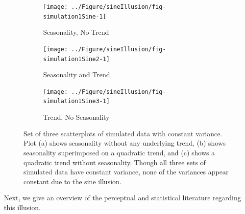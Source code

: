 \documentclass[11pt]{isuthesis}\usepackage[]{graphicx}\usepackage[]{color}
\newenvironment{knitrout}{}{} %
\begin{document}
\begin{figure}[h!tbp]\centering
\begin{subfigure}[b]{.31\textwidth}
  \centering
\begin{knitrout}
\color{fgcolor}

{\centering \texttt{[image: ../Figure/sineIllusion/fig-simulation1Sine-1]} 

}



\end{knitrout}
  \caption{\small Seasonality, No Trend}
  \label{simulation1}
\end{subfigure}
\begin{subfigure}[b]{.31\textwidth}\centering
\begin{knitrout}
\color{fgcolor}

{\centering \texttt{[image: ../Figure/sineIllusion/fig-simulation1Sine2-1]} 

}



\end{knitrout}
  \caption{\small Seasonality and Trend}
  \label{simulation2}
\end{subfigure}
\begin{subfigure}[b]{.31\textwidth}\centering
\begin{knitrout}
\color{fgcolor}

{\centering \texttt{[image: ../Figure/sineIllusion/fig-simulation1Sine3-1]} 

}



\end{knitrout}
  \caption{\small Trend, No Seasonality}
  \label{simulation3}
\end{subfigure}
\caption[Trend, seasonality, and the sine illusion]{Set of three scatterplots of simulated data with constant variance. Plot (a) shows seasonality without any underlying trend, (b) shows seasonality superimposed on a quadratic trend, and (c) shows a quadratic trend without seasonality. Though all three sets of simulated data have constant variance, none of the variances appear constant due to the sine illusion.}\label{fig:twoillusions-simulation}
\end{figure}

Next, we give an overview of the perceptual and statistical literature regarding this illusion.
\end{document}
